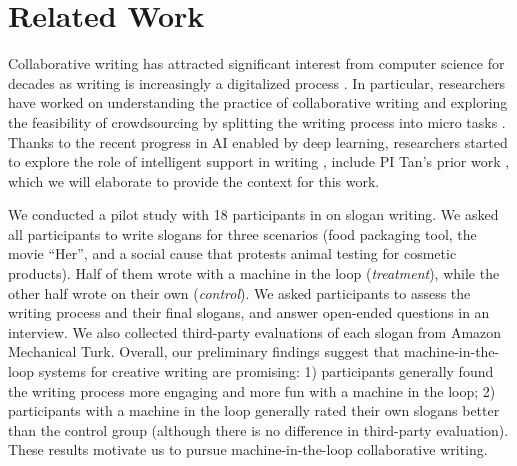 
\section{Related Work}


Collaborative writing has attracted significant interest from computer science for decades as writing is increasingly a digitalized process \citep{sharples1993research}.
In particular, researchers have worked on understanding the practice of collaborative writing  \citep{birnholtz2013write,wang2017users} and exploring the feasibility of crowdsourcing by splitting the writing process into micro tasks \citep{bernstein2010soylent,teevan2016supporting,salehi2017communicating}. 
Thanks to the recent progress in AI enabled by deep learning, researchers started to explore the role of intelligent support in writing \citep{gehrmann2015deploying}, include PI Tan's prior work \citep{clark+etal18}, which we will elaborate to provide the context for this work.

 We conducted a pilot study with 18 participants in \citet{clark+etal18} on slogan writing.
We asked all participants to write slogans for three scenarios (food packaging tool,
the movie ``Her'', and a social cause that protests animal testing
for cosmetic products).
Half of them wrote with a machine in the loop ({\em treatment}), while the other half wrote on their own ({\em control}).
We asked participants to assess the writing process and their final slogans, and answer open-ended questions in an interview.
We also collected third-party evaluations of each slogan from Amazon Mechanical Turk.
Overall, our preliminary findings suggest that machine-in-the-loop systems for creative writing are promising: 1) participants generally found the writing process more engaging and more fun with a machine in the loop;
2) participants with a machine in the loop generally rated their own slogans better than the control group (although there is no difference in third-party evaluation).
These results motivate us to pursue machine-in-the-loop collaborative writing.


